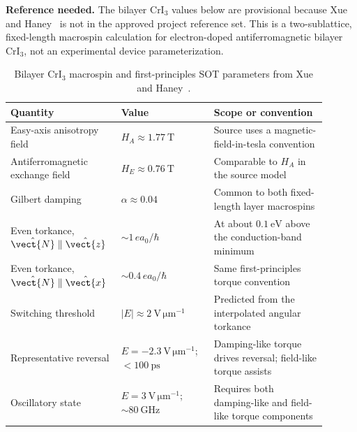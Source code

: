 \textbf{Reference needed.}  The bilayer CrI$_3$ values below are provisional
because Xue and Haney~\cite{xue2021cri3-sot} is not in the approved project
reference set.  This is a two-sublattice, fixed-length macrospin calculation
for electron-doped antiferromagnetic bilayer CrI$_3$, not an experimental
device parameterization.

\begin{table}[htbp]
    \centering
    \small
    \renewcommand{\arraystretch}{1.12}
    \begin{tabular}{p{0.28\linewidth}p{0.28\linewidth}p{0.34\linewidth}}
        \hline
        Quantity & Value & Scope or convention \\
        \hline
        Easy-axis anisotropy field
            & $H_A\approx1.77\ \mathrm{T}$
            & Source uses a magnetic-field-in-tesla convention \\
        Antiferromagnetic exchange field
            & $H_E\approx0.76\ \mathrm{T}$
            & Comparable to $H_A$ in the source model \\
        Gilbert damping
            & $\alpha\approx0.04$
            & Common to both fixed-length layer macrospins \\
        Even torkance, $\hat{\vect{N}}\parallel\hat{\vect{z}}$
            & $\sim1\,e a_0/\hbar$
            & At about $0.1\ \mathrm{eV}$ above the conduction-band minimum \\
        Even torkance, $\hat{\vect{N}}\parallel\hat{\vect{x}}$
            & $\sim0.4\,e a_0/\hbar$
            & Same first-principles torque convention \\
        Switching threshold
            & $\lvert E\rvert\approx2\ \mathrm{V\,\mu m^{-1}}$
            & Predicted from the interpolated angular torkance \\
        Representative reversal
            & $E=-2.3\ \mathrm{V\,\mu m^{-1}}$; $<100\ \mathrm{ps}$
            & Damping-like torque drives reversal; field-like torque assists \\
        Oscillatory state
            & $E=3\ \mathrm{V\,\mu m^{-1}}$; $\sim80\ \mathrm{GHz}$
            & Requires both damping-like and field-like torque components \\
        \hline
    \end{tabular}
    \caption{Bilayer CrI$_3$ macrospin and first-principles SOT parameters from
        Xue and Haney~\cite{xue2021cri3-sot}.}
    \label{tab:cri3-sot-parameters}
\end{table}

